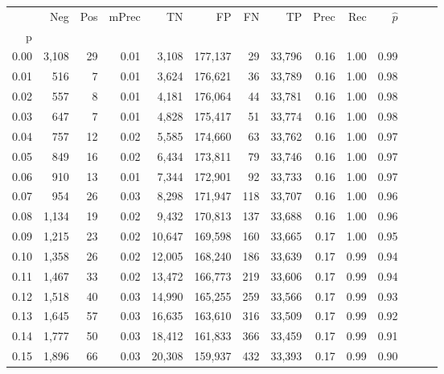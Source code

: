 \begin{tabular}{rrrrrrrrrrrrrr}
\toprule
{} &    Neg &  Pos & mPrec &       TN &       FP &      FN &      TP &  Prec &   Rec & $\hat{p}$ \\
p    &        &      &       &          &          &         &         &       &       &           \\
\midrule
0.00 &  3,108 &   29 &  0.01 &    3,108 &  177,137 &      29 &  33,796 &  0.16 &  1.00 &      0.99 \\
0.01 &    516 &    7 &  0.01 &    3,624 &  176,621 &      36 &  33,789 &  0.16 &  1.00 &      0.98 \\
0.02 &    557 &    8 &  0.01 &    4,181 &  176,064 &      44 &  33,781 &  0.16 &  1.00 &      0.98 \\
0.03 &    647 &    7 &  0.01 &    4,828 &  175,417 &      51 &  33,774 &  0.16 &  1.00 &      0.98 \\
0.04 &    757 &   12 &  0.02 &    5,585 &  174,660 &      63 &  33,762 &  0.16 &  1.00 &      0.97 \\
0.05 &    849 &   16 &  0.02 &    6,434 &  173,811 &      79 &  33,746 &  0.16 &  1.00 &      0.97 \\
0.06 &    910 &   13 &  0.01 &    7,344 &  172,901 &      92 &  33,733 &  0.16 &  1.00 &      0.97 \\
0.07 &    954 &   26 &  0.03 &    8,298 &  171,947 &     118 &  33,707 &  0.16 &  1.00 &      0.96 \\
0.08 &  1,134 &   19 &  0.02 &    9,432 &  170,813 &     137 &  33,688 &  0.16 &  1.00 &      0.96 \\
0.09 &  1,215 &   23 &  0.02 &   10,647 &  169,598 &     160 &  33,665 &  0.17 &  1.00 &      0.95 \\
0.10 &  1,358 &   26 &  0.02 &   12,005 &  168,240 &     186 &  33,639 &  0.17 &  0.99 &      0.94 \\
0.11 &  1,467 &   33 &  0.02 &   13,472 &  166,773 &     219 &  33,606 &  0.17 &  0.99 &      0.94 \\
0.12 &  1,518 &   40 &  0.03 &   14,990 &  165,255 &     259 &  33,566 &  0.17 &  0.99 &      0.93 \\
0.13 &  1,645 &   57 &  0.03 &   16,635 &  163,610 &     316 &  33,509 &  0.17 &  0.99 &      0.92 \\
0.14 &  1,777 &   50 &  0.03 &   18,412 &  161,833 &     366 &  33,459 &  0.17 &  0.99 &      0.91 \\
0.15 &  1,896 &   66 &  0.03 &   20,308 &  159,937 &     432 &  33,393 &  0.17 &  0.99 &      0.90 \\

\end{tabular}
